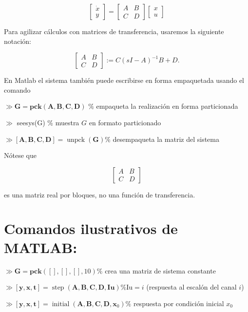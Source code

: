 \documentclass[11pt]{article}
\begin{document}
$$
\left[\begin{array}{l}
\dot{x} \\
y
\end{array}\right]=\left[\begin{array}{cc}
A & B \\
C & D
\end{array}\right]\left[\begin{array}{l}
x \\
u
\end{array}\right]
$$

Para agilizar cálculos con matrices de transferencia, usaremos la siguiente notación:

$$
\left[\begin{array}{l|l}
A & B \\
\hline C & D
\end{array}\right]:=C(s I-A)^{-1} B+D .
$$

En Matlab el sistema también puede escribirse en forma empaquetada usando el comando

$\gg \mathbf{G}=\mathbf{p c k}(\mathbf{A}, \mathbf{B}, \mathbf{C}, \mathbf{D})$ \% empaqueta la realización en forma particionada

$\gg$ seesys(G) \% muestra $G$ en formato particionado

$\gg[\mathbf{A}, \mathbf{B}, \mathbf{C}, \mathbf{D}]=\operatorname{unpck}(\mathbf{G}) \%$ desempaqueta la matriz del sistema

Nótese que

$$
\left[\begin{array}{ll}
A & B \\
C & D
\end{array}\right]
$$

es una matriz real por bloques, no una función de transferencia.

\section*{Comandos ilustrativos de MATLAB:}
$\gg \mathbf{G}=\mathbf{p c k}([],[],[], 10) \%$ crea una matriz de sistema constante

$\gg[\mathbf{y}, \mathbf{x}, \mathbf{t}]=\operatorname{step}(\mathbf{A}, \mathbf{B}, \mathbf{C}, \mathbf{D}, \mathbf{Iu}) \% \mathrm{Iu}=i$ (respuesta al escalón del canal $i$)

$\gg[\mathbf{y}, \mathbf{x}, \mathbf{t}]=\operatorname{initial}\left(\mathbf{A}, \mathbf{B}, \mathbf{C}, \mathbf{D}, \mathbf{x}_{0}\right) \%$ respuesta por condición inicial $x_{0}$
\end{document}
